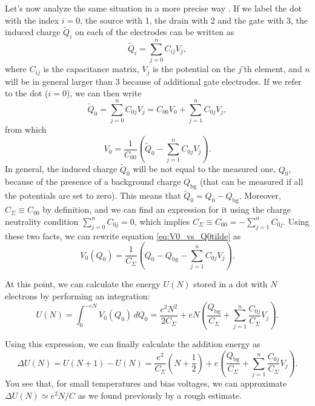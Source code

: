 Let's now analyze the same situation in a more precise way \citep[adapted from][]{Fasth2007}. If we label the dot with the index $i=0$, the source with 1, the drain with 2 and the gate with 3, the induced charge $\tilde{Q}_i$ on each of the electrodes can be written as
\begin{equation}
	\tilde{Q}_i = \sum_{j=0}^{n}C_{ij}V_j,
\end{equation}
where $C_{ij}$ is the capacitance matrix, $V_j$ is the potential on the $j$'th element, and $n$ will be in general larger than 3 because of additional gate electrodes. If we refer to the dot ($i=0$), we can then write
\begin{equation}
	\tilde{Q}_0 = \sum_{j=0}^{n}C_{0j}V_j = C_{00}V_0 + \sum_{j=1}^{n}C_{0j}V_j,
\end{equation}
from which
\begin{equation}
	V_0 = \frac{1}{C_{00}}\left(\tilde{Q}_0 - \sum_{j=1}^{n}C_{0j}V_j\right).
	\label{eq:V0_vs_Q0tilde}
\end{equation}
In general, the induced charge $\tilde{Q}_0$ will be not equal to the measured one, $Q_0$, because of the presence of a background charge $Q_{\text{bg}}$ (that can be measured if all the potentials are set to zero). This means that $\tilde{Q}_0 = Q_0 - Q_{\text{bg}}$. Moreover, $C_{\Sigma} \equiv C_{00}$ by definition, and we can find an expression for it using the charge neutrality condition $\sum_{j=0}^{n}C_{0j}=0$, which implies $C_{\Sigma} \equiv C_{00} = -\sum_{j=1}^{n}C_{0j}$. Using these two facts, we can rewrite equation \eqref{eq:V0_vs_Q0tilde} as
\begin{equation}
	V_0(Q_0) = \frac{1}{C_{\Sigma}}\left(Q_0 - Q_{\text{bg}} - \sum_{j=1}^{n}C_{0j}V_j\right).
	\label{eq:V0_vs_Q0}
\end{equation}

At this point, we can calculate the energy $U(N)$ stored in a dot with $N$ electrons by performing an integration:
\begin{equation}
	U(N) = \int_{0}^{-eN}V_0(Q_0)\,dQ_0 = \frac{e^2N^2}{2C_{\Sigma}} + eN\left( \frac{Q_{\text{bg}}}{C_{\Sigma}} + \sum_{j=1}^{n}\frac{C_{0j}}{C_{\Sigma}}V_j \right).
\end{equation}

Using this expression, we can finally calculate the addition energy as
\begin{equation}
	\Delta U (N) = U(N+1)-U(N) = \frac{e^2}{C_{\Sigma}}\left(N+\frac{1}{2}\right) + e\left( \frac{Q_{\text{bg}}}{C_{\Sigma}} + \sum_{j=1}^{n}\frac{C_{0j}}{C_{\Sigma}}V_j \right).
\end{equation}
You see that, for small temperatures and bias voltages, we can approximate $\Delta U (N) \simeq e^2N/C$ as we found previously by a rough estimate.

